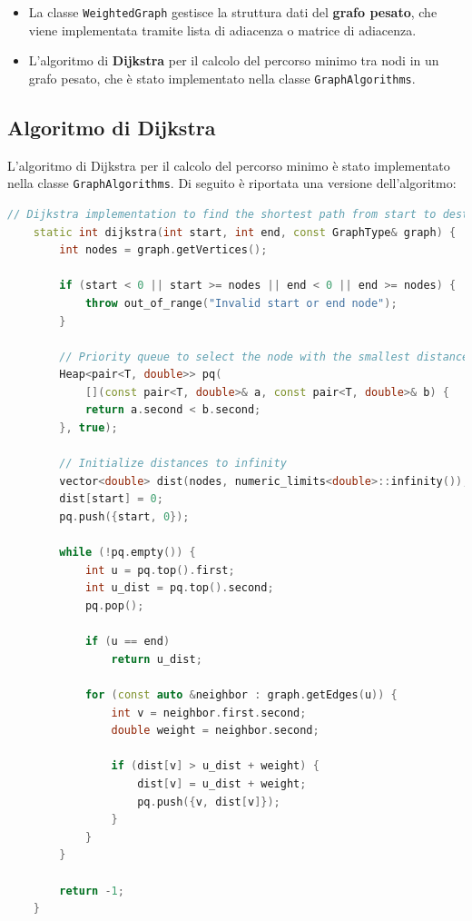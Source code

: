 \documentclass[a4paper,12pt]{article}
\begin{document}
\begin{itemize}
    \item La classe \texttt{WeightedGraph} gestisce la struttura dati del 
    \textbf{grafo pesato}, che viene implementata tramite lista di adiacenza o 
    matrice di adiacenza. 

    \item L'algoritmo di \textbf{Dijkstra} per il calcolo del percorso minimo tra nodi 
    in un grafo pesato, che è stato implementato nella classe \texttt{GraphAlgorithms}.
\end{itemize}

\subsection{Algoritmo di Dijkstra}

L'algoritmo di Dijkstra per il calcolo del percorso minimo è stato implementato nella 
classe \texttt{GraphAlgorithms}. 
Di seguito è riportata una versione dell'algoritmo: 

\clearpage

\begin{lstlisting}[language=c++, label=Dijkstra]
    // Dijkstra implementation to find the shortest path from start to destination
    static int dijkstra(int start, int end, const GraphType& graph) {
        int nodes = graph.getVertices();

        if (start < 0 || start >= nodes || end < 0 || end >= nodes) {
            throw out_of_range("Invalid start or end node");
        }

        // Priority queue to select the node with the smallest distance
        Heap<pair<T, double>> pq(
            [](const pair<T, double>& a, const pair<T, double>& b) {
            return a.second < b.second;
        }, true);

        // Initialize distances to infinity
        vector<double> dist(nodes, numeric_limits<double>::infinity());
        dist[start] = 0;
        pq.push({start, 0});

        while (!pq.empty()) {
            int u = pq.top().first; 
            int u_dist = pq.top().second;
            pq.pop();

            if (u == end)
                return u_dist;

            for (const auto &neighbor : graph.getEdges(u)) {
                int v = neighbor.first.second;
                double weight = neighbor.second;

                if (dist[v] > u_dist + weight) {
                    dist[v] = u_dist + weight;
                    pq.push({v, dist[v]});
                }
            }
        }

        return -1;
    }


\end{lstlisting}
\end{document}
